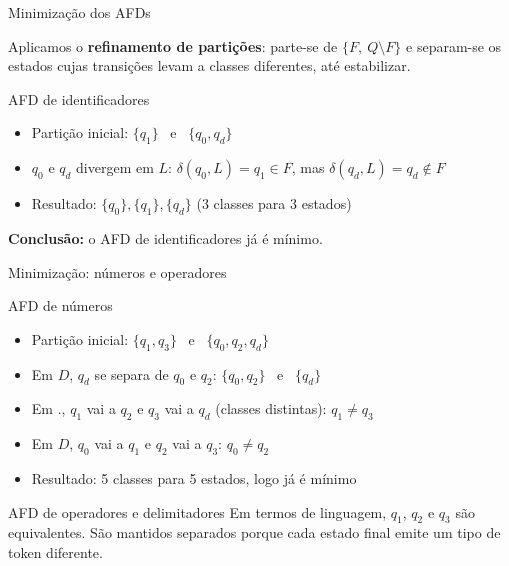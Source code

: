 \documentclass[aspectratio=169, 11pt]{beamer}
\begin{document}
\begin{frame}{Minimização dos AFDs}

    Aplicamos o \textbf{refinamento de partições}: parte-se de $\{F,\ Q\setminus F\}$ e
    separam-se os estados cujas transições levam a classes diferentes, até estabilizar.

    \vspace{0.3cm}

    \begin{block}{AFD de identificadores}
        \begin{itemize}
            \item Partição inicial: $\{q_1\}$ \ e \ $\{q_0, q_d\}$
            \item $q_0$ e $q_d$ divergem em $L$: $\delta(q_0,L)=q_1\in F$, mas $\delta(q_d,L)=q_d\notin F$
            \item Resultado: $\{q_0\}, \{q_1\}, \{q_d\}$ (3 classes para 3 estados)
        \end{itemize}
    \end{block}

    \vspace{0.2cm}
    \textbf{Conclusão:} o AFD de identificadores já é mínimo.

\end{frame}

\begin{frame}{Minimização: números e operadores}

    \begin{block}{AFD de números}
        \begin{itemize}
            \item Partição inicial: $\{q_1,q_3\}$ \ e \ $\{q_0,q_2,q_d\}$
            \item Em $D$, $q_d$ se separa de $q_0$ e $q_2$: $\{q_0,q_2\}$ \ e \ $\{q_d\}$
            \item Em $.$, $q_1$ vai a $q_2$ e $q_3$ vai a $q_d$ (classes distintas): $q_1 \neq q_3$
            \item Em $D$, $q_0$ vai a $q_1$ e $q_2$ vai a $q_3$: $q_0 \neq q_2$
            \item Resultado: 5 classes para 5 estados, logo já é mínimo
        \end{itemize}
    \end{block}

    \vspace{0.2cm}

    \begin{block}{AFD de operadores e delimitadores}
        Em termos de linguagem, $q_1$, $q_2$ e $q_3$ são equivalentes. São mantidos
        separados porque cada estado final emite um tipo de token diferente.
    \end{block}

\end{frame}
\end{document}
